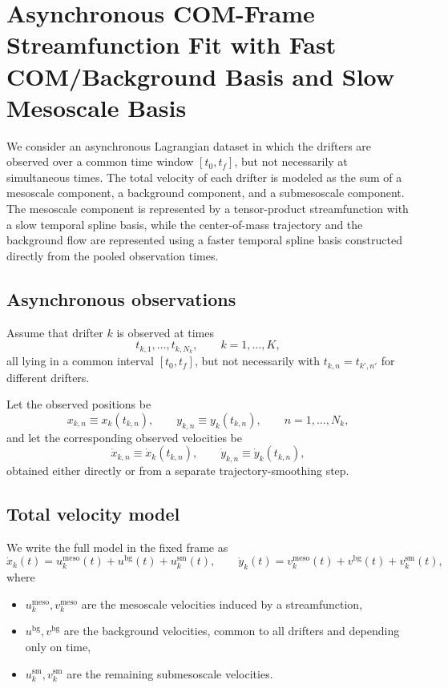\section{Asynchronous COM-Frame Streamfunction Fit with Fast COM/Background Basis and Slow Mesoscale Basis}

We consider an asynchronous Lagrangian dataset in which the drifters are observed over a
common time window $[t_0,t_f]$, but not necessarily at simultaneous times. The total velocity
of each drifter is modeled as the sum of a mesoscale component, a background component, and a
submesoscale component. The mesoscale component is represented by a tensor-product
streamfunction with a slow temporal spline basis, while the center-of-mass trajectory and the
background flow are represented using a faster temporal spline basis constructed directly from
the pooled observation times.

\subsection{Asynchronous observations}

Assume that drifter $k$ is observed at times
\begin{equation}
t_{k,1},\dots,t_{k,N_k}, \qquad k=1,\dots,K,
\end{equation}
all lying in a common interval $[t_0,t_f]$, but not necessarily with
$t_{k,n}=t_{k',n'}$ for different drifters.

Let the observed positions be
\begin{equation}
x_{k,n} \equiv x_k(t_{k,n}),
\qquad
y_{k,n} \equiv y_k(t_{k,n}),
\qquad
n=1,\dots,N_k,
\end{equation}
and let the corresponding observed velocities be
\begin{equation}
\dot{x}_{k,n} \equiv \dot{x}_k(t_{k,n}),
\qquad
\dot{y}_{k,n} \equiv \dot{y}_k(t_{k,n}),
\end{equation}
obtained either directly or from a separate trajectory-smoothing step.

\subsection{Total velocity model}

We write the full model in the fixed frame as
\begin{equation}
\dot{x}_k(t)=u_k^{\mathrm{meso}}(t)+u^{\mathrm{bg}}(t)+u_k^{\mathrm{sm}}(t),
\qquad
\dot{y}_k(t)=v_k^{\mathrm{meso}}(t)+v^{\mathrm{bg}}(t)+v_k^{\mathrm{sm}}(t),
\label{eq:total_model_full}
\end{equation}
where
\begin{itemize}
    \item $u_k^{\mathrm{meso}},v_k^{\mathrm{meso}}$ are the mesoscale velocities induced by a
    streamfunction,
    \item $u^{\mathrm{bg}},v^{\mathrm{bg}}$ are the background velocities, common to all drifters
    and depending only on time,
    \item $u_k^{\mathrm{sm}},v_k^{\mathrm{sm}}$ are the remaining submesoscale velocities.
\end{itemize}

